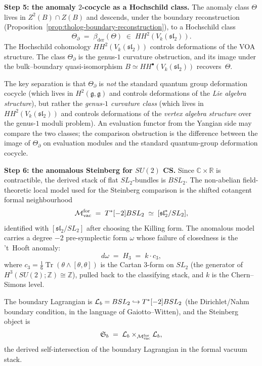 \begin{construction}
\medskip
\noindent\textbf{Step 5: the anomaly $2$-cocycle as a Hochschild
class.}
The anomaly class $\Theta$ lives in $Z^2(B)\cap Z(B)$ and descends,
under the boundary reconstruction
(Proposition~\ref{prop:tholog-boundary-reconstruction}), to a
Hochschild class
\[
\Theta_\partial
\;=\;
\beta_{\mathrm{der}}(\Theta)
\;\in\;
HH^2(V_k(\mathfrak{sl}_2)).
\]
The Hochschild cohomology $HH^2(V_k(\mathfrak{sl}_2))$ controls
deformations of the VOA structure. The class $\Theta_\partial$ is
the genus-$1$ curvature obstruction, and its image under the
bulk--boundary quasi-isomorphism
$B\simeq HH^\bullet(V_k(\mathfrak{sl}_2))$ recovers~$\Theta$.

The key separation is that $\Theta_\partial$ is \emph{not}
the standard quantum group deformation cocycle (which lives in
$H^2(\mathfrak{g},\mathfrak{g})$ and controls deformations of
the \emph{Lie algebra structure}), but rather the \emph{genus-$1$
curvature class} (which lives in
$HH^2(V_k(\mathfrak{sl}_2))$ and controls deformations of the
\emph{vertex algebra structure} over the genus-$1$ moduli problem).
An evaluation functor from the Yangian side may compare the two
classes; the comparison obstruction is the difference between the
image of \(\Theta_\partial\) on evaluation modules and the standard
quantum-group deformation cocycle.

\medskip
\noindent\textbf{Step 6: the anomalous Steinberg for $SU(2)$ CS.}
Since \(\mathbb C\times\mathbb R\) is contractible, the derived
stack of flat \(SL_2\)-bundles is \(BSL_2\).  The non-abelian
field-theoretic local model used for the Steinberg comparison is the
shifted cotangent formal neighbourhood
\[
\mathcal{M}_{\mathrm{vac}}^{\mathrm{for}}
\;=\;
T^*[-2]BSL_2
\;\simeq\;
[\mathfrak{sl}_2^*/SL_2],
\]
identified with \([\mathfrak{sl}_2/SL_2]\) after choosing the
Killing form.  The anomalous model carries a degree \(-2\)
pre-symplectic form \(\omega\) whose failure of closedness is the
't~Hooft anomaly:
\begin{equation}\label{eq:su2-anomaly-3form}
d\omega \;=\; H_3 \;=\; k\cdot c_3,
\end{equation}
where $c_3 = \tfrac{1}{6}\operatorname{Tr}(\theta\wedge[\theta,\theta])$
is the Cartan $3$-form on $SL_2$ (the generator of
$H^3(SU(2);\mathbb Z)\cong\mathbb Z$), pulled back to the
classifying stack, and $k$ is the Chern--Simons level.

The boundary Lagrangian is
\(\mathcal{L}_b = BSL_2 \hookrightarrow T^*[-2]BSL_2\)
(the Dirichlet/Nahm boundary condition, in the language of
Gaiotto--Witten), and the Steinberg object is
\[
\mathfrak{S}_b
\;=\;
\mathcal{L}_b\times_{\mathcal{M}_{\mathrm{vac}}^{\mathrm{for}}}\mathcal{L}_b,
\]
the derived self-intersection of the boundary Lagrangian in the
formal vacuum stack.


\end{construction}
